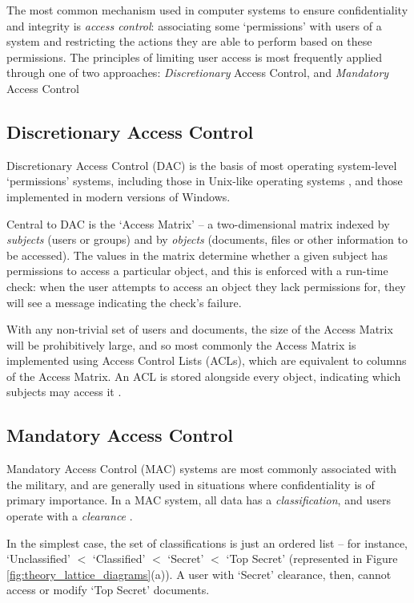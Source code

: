 The most common mechanism used in computer systems to ensure confidentiality and integrity is \textit{access control}: associating some `permissions' with users of a system and restricting the actions they are able to perform based on these permissions. The principles of limiting user access is most frequently applied through one of two approaches: \textit{Discretionary} Access Control, and \textit{Mandatory} Access Control

\subsection{Discretionary Access Control}

Discretionary Access Control (DAC) is the basis of most operating system-level `permissions' systems, including those in Unix-like operating systems \cite{sandhu1996role}, and those implemented in modern versions of Windows.

Central to DAC is the `Access Matrix' \cite{sandhu1994access} -- a two-dimensional matrix indexed by \textit{subjects} (users or groups) and by \textit{objects} (documents, files or other information to be accessed). The values in the matrix determine whether a given subject has permissions to access a particular object, and this is enforced with a run-time check: when the user attempts to access an object they lack permissions for, they will see a message indicating the check's failure.

With any non-trivial set of users and documents, the size of the Access Matrix will be prohibitively large, and so most commonly the Access Matrix is implemented using Access Control Lists (ACLs), which are equivalent to columns of the Access Matrix. An ACL is stored alongside every object, indicating which subjects may access it \cite{sandhu1994access}.

\subsection{Mandatory Access Control} \label{accesscontrol_mac}

Mandatory Access Control (MAC) systems are most commonly associated with the military, and are generally used in situations where confidentiality is of primary importance. In a MAC system, all data has a \textit{classification}, and users operate with a \textit{clearance} \cite{sandhu1994access}. 

In the simplest case, the set of classifications is just an ordered list -- for instance, `Unclassified' $ < $ `Classified' $ < $ `Secret' $ < $ `Top Secret' (represented in Figure \ref{fig:theory_lattice_diagrams}(a)). A user with `Secret' clearance, then, cannot access or modify `Top Secret' documents.

